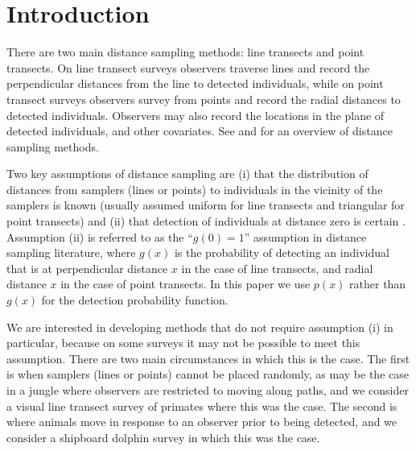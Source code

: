 \documentclass[useAMS,usenatbib,referee]{biom}
\begin{document}
\section{Introduction\label{intro}}

There are two main distance sampling methods: line transects and point transects. On line transect surveys observers traverse lines and record the perpendicular distances from the line to detected individuals, while on point transect surveys observers survey from points and record the radial distances to detected individuals. Observers may also record the locations in the plane of detected individuals, and other covariates. See \cite{Marques+al:10} and \cite{Buckland+al:01} for an overview of distance sampling methods.

Two key assumptions of distance sampling are (i) that the distribution of distances from samplers (lines or points) to individuals in the vicinity of the samplers is known (usually assumed uniform for line transects and triangular for point transects) and (ii) that detection of individuals at distance zero is certain \citep{Buckland+al:01}. Assumption (ii) is referred to as the ``$g(0)=1$'' assumption in distance sampling literature, where $g(x)$ is the probability of detecting an individual that is at perpendicular distance $x$ in the case of line transects, and radial distance $x$ in the case of point transects. In this paper we use $p(x)$ rather than $g(x)$ for the detection probability function.

We are interested in developing methods that do not require assumption (i) in particular, because on some surveys it may not be possible to meet this assumption. There are two main circumstances in which this is the case. The first is when samplers (lines or points) cannot be placed randomly, as may be the case in a jungle where observers are restricted to moving along paths, and we consider a visual line transect survey of primates where this was the case. The second is where animals move in response to an observer prior to being detected, and we consider a shipboard dolphin survey in which this was the case. %
\end{document}
